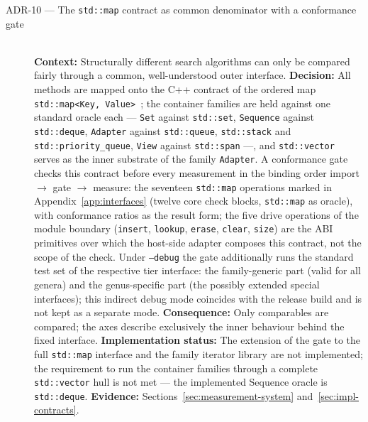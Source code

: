 \begin{description}
  \item[ADR-10 --- The \texttt{std::map} contract as common denominator with a conformance gate]\hfill\\
  \textbf{Context:} Structurally different search algorithms can only be compared fairly through
  a common, well-understood outer interface.
  \textbf{Decision:} All methods are mapped onto the C++ contract of the ordered map
  \texttt{std::map<Key,\,Value>}~\cite{iso_cpp}; the container families are held against one
  standard oracle each --- \texttt{Set} against \texttt{std::set}, \texttt{Sequence} against
  \texttt{std::deque}, \texttt{Adapter} against \texttt{std::queue}, \texttt{std::stack} and
  \texttt{std::priority\_queue}, \texttt{View} against \texttt{std::span} ---, and
  \texttt{std::vector} serves as the inner substrate of the family \texttt{Adapter}. A conformance
  gate checks this contract before every measurement in the binding order import $\to$ gate $\to$
  measure: the seventeen \texttt{std::map} operations marked in Appendix~\ref{app:interfaces} (twelve
  core check blocks, \texttt{std::map} as oracle), with conformance ratios as the result form; the five
  drive operations of the module boundary (\texttt{insert}, \texttt{lookup}, \texttt{erase},
  \texttt{clear}, \texttt{size}) are the ABI primitives over which the host-side adapter composes this
  contract, not the scope of the check. Under \texttt{--debug} the gate additionally runs the standard
  test set of the respective tier interface: the family-generic part (valid for all genera) and the
  genus-specific part (the possibly extended special interfaces); this indirect debug mode coincides with
  the release build and is not kept as a separate mode.
  \textbf{Consequence:} Only comparables are compared; the axes describe exclusively the inner
  behaviour behind the fixed interface.
  \textbf{Implementation status:} The extension of the gate to the full \texttt{std::map}
  interface and the family iterator library are not implemented; the requirement to run the
  container families through a complete \texttt{std::vector} hull is not met --- the implemented
  Sequence oracle is \texttt{std::deque}.
  \textbf{Evidence:} Sections~\ref{sec:measurement-system} and~\ref{sec:impl-contracts}.


\end{description}
